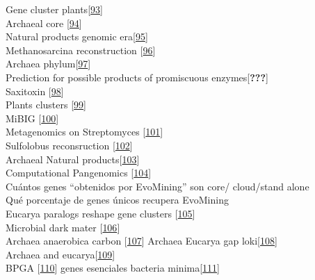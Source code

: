 \documentclass[12pt,twoside]{reedthesis}
\begin{document}
  Gene cluster plants{[}\protect\hyperlink{ref-osbourn_gene_2010}{93}{]}\\
  Archaeal core
  {[}\protect\hyperlink{ref-makarova_comparative_1999}{94}{]}\\
  Natural products genomic
  era{[}\protect\hyperlink{ref-harvey_re-emergence_2015}{95}{]}\\
  Methanosarcina reconstruction
  {[}\protect\hyperlink{ref-benedict_genome-scale_2012}{96}{]}\\
  Archaea phylum{[}\protect\hyperlink{ref-seitz_genomic_2016}{97}{]}\\
  Prediction for possible products of promiscuous
  enzymes{[}{\textbf{???}}{]}\\
  Saxitoxin {[}\protect\hyperlink{ref-moustafa_origin_2009}{98}{]}\\
  Plants clusters
  {[}\protect\hyperlink{ref-medema_computational_2016}{99}{]}\\
  MiBIG {[}\protect\hyperlink{ref-medema_minimum_2015}{100}{]}\\
  Metagenomics on Streptomyces
  {[}\protect\hyperlink{ref-iqbal_natural_2016}{101}{]}\\
  Sulfolobus reconsruction
  {[}\protect\hyperlink{ref-ulas_genome-scale_2012}{102}{]}\\
  Archaeal Natural
  products{[}\protect\hyperlink{ref-charlesworth_untapped_2015}{103}{]}\\
  Computational Pangenomics
  {[}\protect\hyperlink{ref-computational_pan-genomics_consortium_computational_2016}{104}{]}\\
  Cuántos genes ``obtenidos por EvoMining'' son core/ cloud/stand alone\\
  Qué porcentaje de genes únicos recupera EvoMining\\
  Eucarya paralogs reshape gene clusters
  {[}\protect\hyperlink{ref-chan_remodelling_2015}{105}{]}\\
  Microbial dark mater
  {[}\protect\hyperlink{ref-rinke_insights_2013}{106}{]}\\
  Archaea anaerobica carbon
  {[}\protect\hyperlink{ref-castelle_genomic_2015}{107}{]} Archaea Eucarya
  gap loki{[}\protect\hyperlink{ref-spang_complex_2015}{108}{]}\\
  Archaea and
  eucarya{[}\protect\hyperlink{ref-koonin_archaeal_2015}{109}{]}\\
  BPGA {[}\protect\hyperlink{ref-chaudhari_bpga-_2016}{110}{]} genes
  esenciales bacteria
  minima{[}\protect\hyperlink{ref-glass_essential_2006}{111}{]}\\
\end{document}
